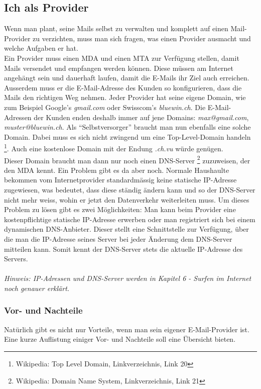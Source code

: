 \subsection{Ich als Provider}
Wenn man plant, seine Mails selbst zu verwalten und komplett auf einen Mail-Provider zu verzichten, muss man sich fragen, was einen Provider ausmacht und welche Aufgaben er hat.
\\
Ein Provider muss einen MDA und einen MTA zur Verfügung stellen, damit Mails versendet und empfangen werden können. Diese müssen am Internet angehängt sein und dauerhaft laufen, damit die E-Mails ihr Ziel auch erreichen.
\\
Ausserdem muss er die E-Mail-Adresse des Kunden so konfigurieren, dass die Mails den richtigen Weg nehmen. Jeder Provider hat seine eigene Domain, wie zum Beispiel Google's \textit{gmail.com} oder Swisscom's \textit{bluewin.ch}. Die E-Mail-Adressen der Kunden enden deshalb immer auf jene Domains: \textit{max@gmail.com}, \textit{muster@bluewin.ch}. Als ``Selbstversorger'' braucht man nun ebenfalls eine solche Domain. Dabei muss es sich nicht zwingend um eine Top-Level-Domain handeln \footnote{Wikipedia: Top Level Domain, Linkverzeichnis, Link 20}. Auch eine kostenlose Domain mit der Endung \textit{.ch.vu} würde genügen.
\\
Dieser Domain braucht man dann nur noch einen DNS-Server \footnote{Wikipedia: Domain Name System, Linkverzeichnis, Link 21} zuzuweisen, der den MDA kennt.
Ein Problem gibt es da aber noch. Normale Haushaulte bekommen vom Internetprovider standardmässig keine statische IP-Adresse zugewiesen, was bedeutet, dass diese ständig ändern kann und so der DNS-Server nicht mehr weiss, wohin er jetzt den Datenverkehr weiterleiten muss. Um dieses Problem zu lösen gibt es zwei Möglichkeiten: Man kann beim Provider eine kostenpflichtige statische IP-Adresse erwerben oder man registriert sich bei einem dynamischen DNS-Anbieter. Dieser stellt eine Schnittstelle zur Verfügung, über die man die IP-Adresse seines Server bei jeder Änderung dem DNS-Server mitteilen kann. Somit kennt der DNS-Server stets die aktuelle IP-Adresse des Servers.
\\
\\
\textit{Hinweis: IP-Adressen und DNS-Server werden in Kapitel 6 - Surfen im Internet noch genauer erklärt.}

\subsubsection{Vor- und Nachteile}
Natürlich gibt es nicht nur Vorteile, wenn man sein eigener E-Mail-Provider ist. Eine kurze Auflistung einiger Vor- und Nachteile soll eine Übersicht bieten.
\\

